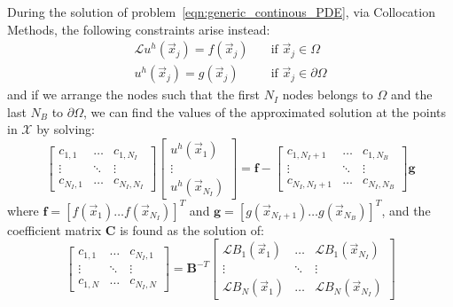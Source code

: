 \medskip
During the solution of problem~\eqref{eqn:generic_continous_PDE}, via Collocation Methods, the following constraints arise instead:
\begin{equation}
	\begin{aligned}
		\mathcal{L} u^h(\vec{x}_j) = f(\vec{x}_j) \quad & \text{if $\vec{x}_j \in \Omega$}  \\
		u^h(\vec{x}_j) = g(\vec{x}_j) 						    \quad & \text{if $\vec{x}_j \in \partial\Omega$}
	\end{aligned}
\end{equation}
and if we arrange the nodes such that the first $N_I$ nodes belongs to $\Omega$ and the last $N_B$ to $\partial\Omega$, we can find the values of the approximated solution at the points in $\mathcal{X}$ by solving:
\begin{equation}
	\begin{bmatrix}
		c_{1,1} 		& 	\dots 		& c_{1,N_I}  \\
		\vdots			& \ddots	& \vdots		\\
		c_{N_I,1} & \dots		& c_{N_I,N_I}
	\end{bmatrix}
	\begin{bmatrix}
		u^h(\vec{x}_1)  \\
		\vdots					\\
		u^h(\vec{x}_{N_I})
	\end{bmatrix}
	=
	\boldsymbol{f} -
	\begin{bmatrix}
		c_{1,N_I+1} 		& 	\dots 		& c_{1,N_B}  \\
		\vdots			& \ddots	& \vdots		\\
		c_{N_I,N_I+1} & \dots		& c_{N_I,N_B}
	\end{bmatrix}
	\boldsymbol{g}
\end{equation}
where $\boldsymbol{f} = [f(\vec{x}_1) \dots f(\vec{x}_{N_I})]^T$ and $\boldsymbol{g} = [g(\vec{x}_{N_I+1}) \dots g(\vec{x}_{N_B})]^T$, and the coefficient matrix $\boldsymbol{C}$ is found as the solution of:
\begin{equation}
	\label{eqn:generic_discretized_PDE_by_MMs}
	\begin{bmatrix}
		c_{1,1} 		& 	\dots 		& c_{N_I,1}  \\
		\vdots			& \ddots	& \vdots		\\
		c_{1,N} & \dots		& c_{N_I,N}
	\end{bmatrix}
	=
	\boldsymbol{B}^{-T}
	\begin{bmatrix}
		\mathcal{L} B_1(\vec{x}_1)  & \dots		& \mathcal{L} B_1(\vec{x}_{N_I})     \\
		\vdots												& \ddots  & \vdots					      								  \\
		\mathcal{L} B_N(\vec{x}_1)  & \dots		& \mathcal{L} B_N(\vec{x}_{N_I})
	\end{bmatrix}
\end{equation}
